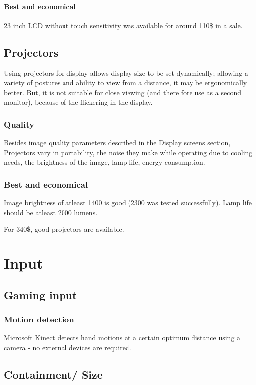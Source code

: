 \documentclass[oneside, article]{memoir}
\begin{document}
\subsubsection{Best and economical}
23 inch LCD without touch sensitivity was available for around 110\$ in a sale.

\section{Projectors}
Using projectors for display allows display size to be set dynamically; allowing a variety of postures and ability to view from a distance, it may be ergonomically better. But, it is not suitable for close viewing (and there fore use as a second monitor), because of the flickering in the display.

\subsection{Quality}
Besides image quality parameters described in the Display screens section, Projectors vary in portability, the noise they make while operating due to cooling needs, the brightness of the image, lamp life, energy consumption.

\subsection{Best and economical}
Image brightness of atleast 1400 is good (2300 was tested successfully). Lamp life should be atleast 2000 lumens.

For 340\$, good projectors are available.

\chapter{Input}
\section{Gaming input}
\subsection{Motion detection}
Microsoft Kinect detects hand motions at a certain optimum distance using a camera - no external devices are required.

\section{Containment/ Size}
\end{document}
